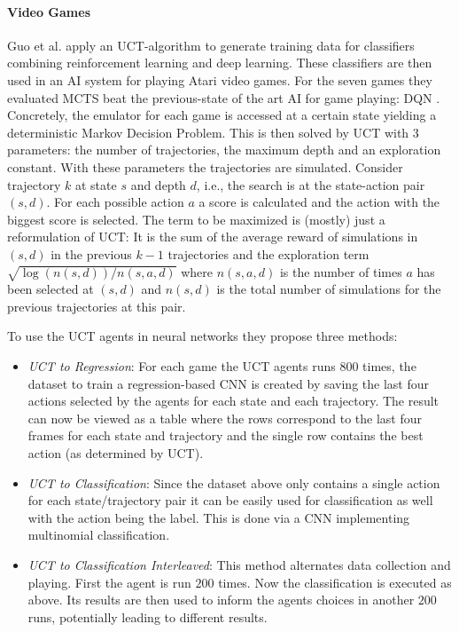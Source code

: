 \paragraph{Video Games} 
Guo et al. \cite{guo2014deep} apply an UCT-algorithm to generate training data for classifiers combining reinforcement learning and deep learning. These classifiers are then used in an AI system for playing Atari video games. For the seven games they evaluated MCTS beat the previous-state of the art AI for game playing: DQN \cite{mnih2013playing}. Concretely, the emulator for each game is accessed at a certain state yielding a deterministic Markov Decision Problem. This is then solved by UCT with 3 parameters: the number of trajectories, the maximum depth and an exploration constant. With these parameters the trajectories are simulated. Consider trajectory $k$ at state $s$ and depth $d$, i.e., the search is at the state-action pair $(s,d)$. For each possible action $a$ a score is calculated and the action with the biggest score is selected. The term to be maximized is (mostly) just a reformulation of UCT: It is the sum of the average reward of simulations in $(s,d)$ in the previous $k-1$ trajectories and the exploration term $\sqrt{\log (n(s,d)) / n(s,a,d)}$ where $n(s,a,d)$ is the number of times $a$ has been selected at $(s,d)$ and $n(s,d)$ is the total number of simulations for the previous trajectories at this pair.

To use the UCT agents in neural networks they propose three methods:
\begin{itemize}
    \item \textit{UCT to Regression}: For each game the UCT agents runs $800$ times, the dataset to train a regression-based CNN is created by saving the last four actions selected by the agents for each state and each trajectory. The result can now be viewed as a table where the rows correspond to the last four frames for each state and trajectory and the single row contains the best action (as determined by UCT).
    \item \textit{UCT to Classification}: Since the dataset above only contains a single action for each state/trajectory pair it can be easily used for classification as well with the action being the label. This is done via a CNN implementing multinomial classification.
    \item \textit{UCT to Classification Interleaved}: This method alternates data collection and playing. First the agent is run $200$ times. Now the classification is executed as above. Its results are then used to inform the agents choices in another $200$ runs, potentially leading to different results. 
\end{itemize}

